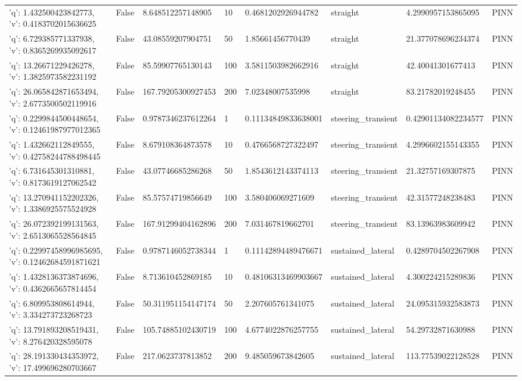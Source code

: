 \begin{tabular}{llllllll}
{'q': 1.432500423842773, 'v': 0.4183702015636625} & False & 8.648512257148905 & 10 & 0.4681202926944782 & straight & 4.2990957153865095 & PINN \\
{'q': 6.729385771337938, 'v': 0.8365269935092617} & False & 43.08559207904751 & 50 & 1.85661456770439 & straight & 21.377078696234374 & PINN \\
{'q': 13.26671229426278, 'v': 1.3825973582231192} & False & 85.59907765130143 & 100 & 3.5811503982662916 & straight & 42.40041301677413 & PINN \\
{'q': 26.065842871653494, 'v': 2.6773500502119916} & False & 167.79205300927453 & 200 & 7.02348007535998 & straight & 83.21782019248455 & PINN \\
{'q': 0.2299844500448654, 'v': 0.12461987977012365} & False & 0.9787346237612264 & 1 & 0.11134849833638001 & steering\_transient & 0.42901134082234577 & PINN \\
{'q': 1.432662112849555, 'v': 0.42758244788498445} & False & 8.679108364873578 & 10 & 0.4766568727322497 & steering\_transient & 4.2996602155143355 & PINN \\
{'q': 6.731645301310881, 'v': 0.8173619127062542} & False & 43.07746685286268 & 50 & 1.8543612143374113 & steering\_transient & 21.32757169307875 & PINN \\
{'q': 13.270941152202326, 'v': 1.3386925575524928} & False & 85.57574719856649 & 100 & 3.580406069271609 & steering\_transient & 42.31577248238483 & PINN \\
{'q': 26.072392199131563, 'v': 2.6513065528564845} & False & 167.91299404162896 & 200 & 7.031467819662701 & steering\_transient & 83.13963983609942 & PINN \\
{'q': 0.22997458996985695, 'v': 0.12462684591871621} & False & 0.9787146052738344 & 1 & 0.11142894489476671 & sustained\_lateral & 0.4289704502267908 & PINN \\
{'q': 1.4328136373874696, 'v': 0.4362665657814454} & False & 8.713610452869185 & 10 & 0.48106313469903667 & sustained\_lateral & 4.300224215289836 & PINN \\
{'q': 6.809953808614944, 'v': 3.334273723268723} & False & 50.311951154147174 & 50 & 2.207605761341075 & sustained\_lateral & 24.095315932583873 & PINN \\
{'q': 13.791893208519431, 'v': 8.276420328595078} & False & 105.74885102430719 & 100 & 4.6774022876257755 & sustained\_lateral & 54.29732871630988 & PINN \\
{'q': 28.191330434353972, 'v': 17.499696280703667} & False & 217.0623737813852 & 200 & 9.485059673842605 & sustained\_lateral & 113.77539022128528 & PINN \\

\end{tabular}
